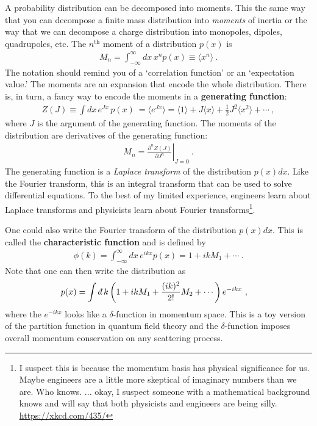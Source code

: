 A probability distribution can be decomposed into moments. This the same way that you can decompose a finite mass distribution into \emph{moments} of inertia or the way that we can decompose a charge distribution into monopoles, dipoles, quadrupoles, etc. The $n^\text{th}$ moment of a distribution $p(x)$ is
\begin{align}
	M_n = \int_{-\infty}^\infty dx \, x^n p(x) \equiv \langle x^n \rangle \ .
\end{align}
The notation should remind you of a `correlation function' or an `expectation value.' The moments are an expansion that encode the whole distribution. There is, in turn, a fancy way to encode the moments in a \textbf{generating function}:
\begin{align}
	Z(J) \equiv \int dx\, e^{J x} \, p(x) \  
	= \langle e^{J x}\rangle
	= \langle 1 \rangle + J \langle x\rangle
	+ \frac{1}{2}J^2 \langle x^2\rangle + \cdots \ ,
	\label{eq:generating:function}
\end{align}
where $J$ is the argument of the generating function. The moments of the distribution are derivatives of the generating function:
\begin{align}
	M_n =
	\left.\frac{\partial^n Z(J)}{\partial J^n}\right|_{J = 0} \ .
\end{align}
The generating function is a \emph{Laplace transform} of the distribution $p(x)dx$. Like the Fourier transform, this is an integral transform that can be used to solve differential equations. To the best of my limited experience, engineers learn about Laplace transforms and physicists learn about Fourier transforms\footnote{I suspect this is because the momentum basis has physical significance for us. Maybe engineers are a little more skeptical of imaginary numbers than we are. Who knows. ... okay, I suspect someone with a mathematical background knows and will say that both physicists and engineers are being silly. \url{https://xkcd.com/435/}}.
\begin{example}
One could also write the Fourier transform of the distribution $p(x)dx$. This is called the \textbf{characteristic function} and is defined by
\begin{align}
	\phi(k) = \int_{-\infty}^\infty dx\, e^{ikx}p(x) = 1 + ikM_1 + \cdots \ .
\end{align}
Note that one can then write the distribution as
\begin{align}
	p(x) &= \int \dbar k\left( 1+ikM_1 + \frac{(ik)^2}{2!}M_2 + \cdots \right)e^{-ikx} \ ,
\end{align}
where the $e^{-ikx}$ looks like a $\delta$-function in momentum space. This is a toy version of the partition function in quantum field theory and the $\delta$-function imposes overall momentum conservation on any scattering process. 
\end{example}

